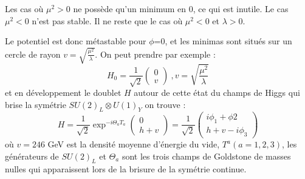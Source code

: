 Les cas où $\mu^{2}>0$ ne possède qu'un minimum en $0$, ce qui est inutile. Le cas $\mu^{2}<0$ n'est pas stable. Il ne reste que le cas où $\mu^{2}<0$ et $\lambda>0$.

\begin{minipagewithmarginpars}[h]{\textwidth}
\centering
\label{pot}
\end{minipagewithmarginpars}
Le potentiel est donc métastable pour $\phi$=0, et les minimas sont situés sur un cercle de rayon $v=\sqrt{\frac{\mu^{2}}{\lambda}}$. On peut prendre par exemple :
\begin{equation}
H_{0}=\frac{1}{\sqrt{2}}\begin{pmatrix} 
0\\
v
\end{pmatrix} \ , v=\sqrt{\frac{\mu^{2}}{\lambda}}
\end{equation}
et en développement le doublet $H$ autour de cette état du champs de Higgs qui brise la symétrie $SU(2)_{L}\otimes U(1)_{Y}$ on trouve : 
\begin{equation}
H=\frac{1}{\sqrt{2}}\exp^{-i\Theta_{a}T_{a}}\begin{pmatrix} 
0\\
h+v
\end{pmatrix}=\frac{1}{\sqrt{2}}\begin{pmatrix} 
i\phi_{1}+\phi{2}\\
h+v-i\phi_{3}
\end{pmatrix}
\end{equation}
où $v=246$ GeV est la densité moyenne d'énergie du vide, $T^{a} (a=1,2,3)$, les générateurs de $SU(2)_{L}$ et $\Theta_{a}$ sont les trois champs de Goldstone de masses nulles qui apparaissent lors de la brisure de la symétrie continue.


